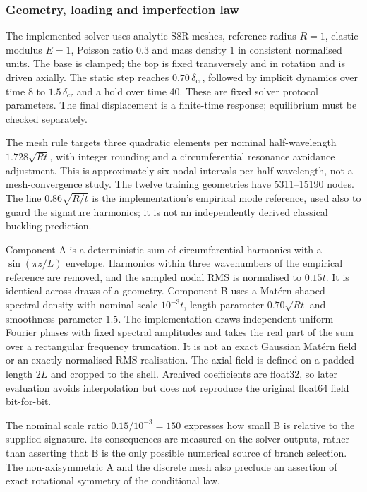 \subsubsection{Geometry, loading and imperfection law}
The implemented solver uses analytic S8R meshes, reference radius $R=1$,
elastic modulus $E=1$, Poisson ratio $0.3$ and mass density $1$ in consistent
normalised units. The base is clamped; the top is fixed transversely and in
rotation and is driven axially. The static step reaches
$0.70\,\delta_{\mathrm{cr}}$, followed by implicit dynamics over time 8 to
$1.5\,\delta_{\mathrm{cr}}$ and a hold over time 40. These are fixed solver
protocol parameters. The final displacement is a finite-time response;
equilibrium must be checked separately.

The mesh rule targets three quadratic elements per nominal half-wavelength
$1.728\sqrt{Rt}$, with integer rounding and a circumferential resonance
avoidance adjustment. This is approximately six nodal intervals per
half-wavelength, not a mesh-convergence study. The twelve training geometries
have 5311--15190 nodes. The line $0.86\sqrt{R/t}$ is the implementation's
empirical mode reference, used also to guard the signature harmonics; it is
not an independently derived classical buckling prediction.

Component A is a deterministic sum of circumferential harmonics with a
$\sin(\pi z/L)$ envelope. Harmonics within three wavenumbers of the empirical
reference are removed, and the sampled nodal RMS is normalised to $0.15t$.
It is identical across draws of a geometry. Component B uses a Mat\'ern-shaped
spectral density with nominal scale $10^{-3}t$, length parameter
$0.70\sqrt{Rt}$ and smoothness parameter $1.5$. The implementation draws
independent uniform Fourier phases with fixed spectral amplitudes and takes
the real part of the sum over a rectangular frequency truncation. It is not
an exact Gaussian Mat\'ern field or an exactly normalised RMS realisation.
The axial field is defined on a padded length $2L$ and cropped to the shell.
Archived coefficients are float32, so later evaluation avoids interpolation
but does not reproduce the original float64 field bit-for-bit.

The nominal scale ratio $0.15/10^{-3}=150$ expresses how small B is relative
to the supplied signature. Its consequences are measured on the solver
outputs, rather than asserting that B is the only possible numerical source
of branch selection. The non-axisymmetric A and the discrete mesh also
preclude an assertion of exact rotational symmetry of the conditional law.

